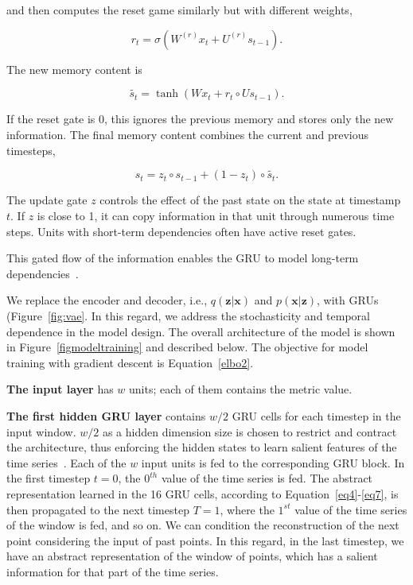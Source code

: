 and then computes the reset game similarly but with different weights,

\begin{equation}\label{eq5}
    r_t=\sigma(W^{(r)}x_t + U^{(r)}s_{t-1}).
\end{equation}

The new memory content is

\begin{equation}\label{eq6}
    \tilde{s_t}=\tanh(Wx_t + r_t \circ U s_{t-1}).
\end{equation}

If the reset gate is 0, this ignores the previous memory and stores only the new information.
The final memory content combines the current and previous timesteps, 

\begin{equation}\label{eq7}
    s_t = z_t \circ s_{t-1} + (1-z_t)\circ \tilde{s_t}.
\end{equation}

The update gate $z$ controls the effect of the past state on the state at timestamp $t$.
If $z$ is close to 1, it can copy information in that unit through numerous time steps. Units with short-term dependencies often have active reset gates. 

This gated flow of the information enables the GRU to model long-term dependencies~\cite{chung2015recurrent}.

We replace the encoder and decoder, i.e., $q(\mathbf{z}|\mathbf{x})$ and $p(\mathbf{x}|\mathbf{z})$, with GRUs (Figure~\ref{fig:vae}. In this regard, we address the stochasticity and temporal dependence in the model design. The overall architecture of the model is shown in Figure~\ref{figmodeltraining} and described below. The objective for model training with gradient descent is Equation~\ref{elbo2}.

\textbf{The input layer} has $w$ units; each of them contains the metric value.

\textbf{The first hidden GRU layer} contains $w/2$ GRU cells for each timestep in the input window. $w/2$ as a hidden dimension size is chosen to restrict and contract the architecture, thus enforcing the hidden states to learn salient features of the time series~\cite{Goodfellow-et-al-2016}. Each of the $w$ input units is fed to the corresponding GRU block. In the first timestep $t=0$, the $0^{th}$ value of the time series is fed. 
The abstract representation learned in the 16 GRU cells, according to Equation~\ref{eq4}-\ref{eq7}, is then propagated to the next timestep $T=1$, where the $1^{st}$ value of the time series of the window is fed, and so on.
We can condition the reconstruction of the next point considering the input of past points. In this regard, in the last timestep, we have an abstract representation of the window of points, which has a salient information for that part of the time series.

